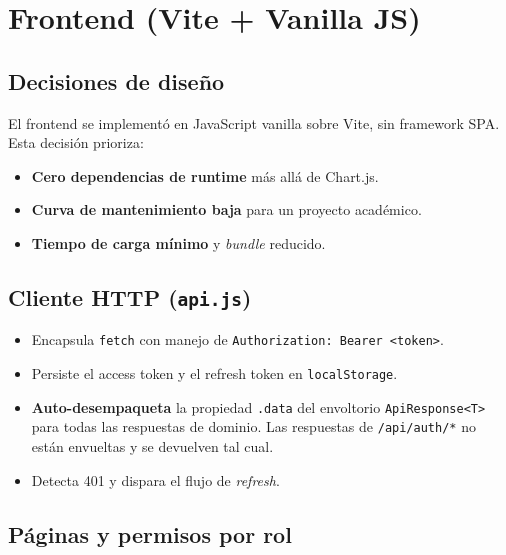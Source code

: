 \documentclass[11pt,a4paper,oneside]{article}
\newcommand{\code}[1]{\texttt{\small #1}}
\begin{document}
\section{Frontend (Vite + Vanilla JS)}

\subsection{Decisiones de diseño}

El frontend se implementó en JavaScript vanilla sobre Vite, sin framework SPA. Esta decisión
prioriza:

\begin{itemize}[leftmargin=*]
  \item \textbf{Cero dependencias de runtime} más allá de Chart.js.
  \item \textbf{Curva de mantenimiento baja} para un proyecto académico.
  \item \textbf{Tiempo de carga mínimo} y \emph{bundle} reducido.
\end{itemize}

\subsection{Cliente HTTP (\code{api.js})}

\begin{itemize}[leftmargin=*]
  \item Encapsula \code{fetch} con manejo de \code{Authorization: Bearer <token>}.
  \item Persiste el access token y el refresh token en \code{localStorage}.
  \item \textbf{Auto-desempaqueta} la propiedad \code{.data} del envoltorio
        \code{ApiResponse<T>} para todas las respuestas de dominio. Las respuestas de
        \code{/api/auth/*} no están envueltas y se devuelven tal cual.
  \item Detecta 401 y dispara el flujo de \emph{refresh}.
\end{itemize}

\subsection{Páginas y permisos por rol}
\end{document}
